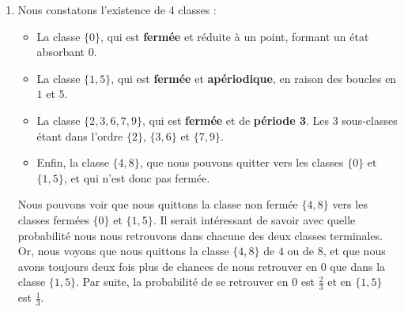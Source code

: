 \begin{enumerate}
\begin{figure}[h!]
\end{figure}



    \item Nous constatons l’existence de 4 classes :
    \begin{itemize}
        \item La classe $\{0\}$, qui est \textbf{fermée} et réduite à un point, formant un état absorbant 0.
        \item La classe $\{1, 5\}$, qui est \textbf{fermée} et \textbf{apériodique}, en raison des boucles en $1$ et $5$.
        \item La classe $\{2, 3, 6, 7, 9\}$, qui est \textbf{fermée} et de \textbf{période 3}. Les 3 sous-classes étant dans l’ordre $\{2\}$, $\{3, 6\}$ et $\{7, 9\}$.
        \item Enfin, la classe $\{4, 8\}$, que nous pouvons quitter vers les classes $\{0\}$ et $\{1, 5\}$, et qui n’est donc pas fermée.
    \end{itemize}

    Nous pouvons voir que nous quittons la classe non fermée $\{4, 8\}$ vers les classes fermées $\{0\}$ et $\{1, 5\}$. Il serait intéressant de savoir avec quelle probabilité nous nous retrouvons dans chacune des deux classes terminales. Or, nous voyons que nous quittons la classe $\{4, 8\}$ de $4$ ou de $8$, et que nous avons toujours deux fois plus de chances de nous retrouver en $0$ que dans la classe $\{1, 5\}$. Par suite, la probabilité de se retrouver en $0$ est $\frac{2}{3}$ et en $\{1, 5\}$ est $\frac{1}{3}$.
\end{enumerate}




